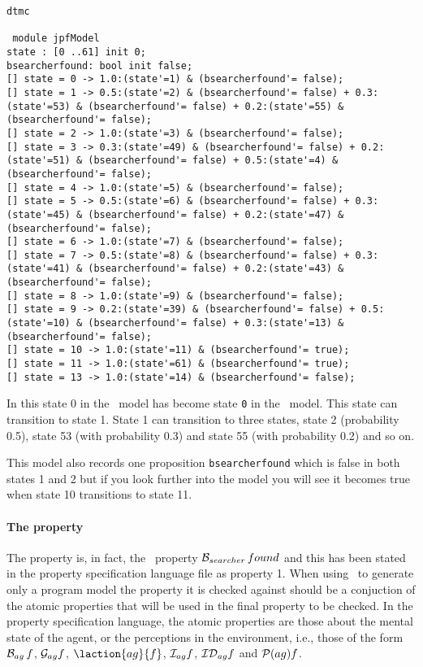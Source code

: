 \documentclass[a4]{article}
\begin{document}
\begin{verbatim}
dtmc

 module jpfModel
state : [0 ..61] init 0;
bsearcherfound: bool init false;
[] state = 0 -> 1.0:(state'=1) & (bsearcherfound'= false);
[] state = 1 -> 0.5:(state'=2) & (bsearcherfound'= false) + 0.3:(state'=53) & (bsearcherfound'= false) + 0.2:(state'=55) & (bsearcherfound'= false);
[] state = 2 -> 1.0:(state'=3) & (bsearcherfound'= false);
[] state = 3 -> 0.3:(state'=49) & (bsearcherfound'= false) + 0.2:(state'=51) & (bsearcherfound'= false) + 0.5:(state'=4) & (bsearcherfound'= false);
[] state = 4 -> 1.0:(state'=5) & (bsearcherfound'= false);
[] state = 5 -> 0.5:(state'=6) & (bsearcherfound'= false) + 0.3:(state'=45) & (bsearcherfound'= false) + 0.2:(state'=47) & (bsearcherfound'= false);
[] state = 6 -> 1.0:(state'=7) & (bsearcherfound'= false);
[] state = 7 -> 0.5:(state'=8) & (bsearcherfound'= false) + 0.3:(state'=41) & (bsearcherfound'= false) + 0.2:(state'=43) & (bsearcherfound'= false);
[] state = 8 -> 1.0:(state'=9) & (bsearcherfound'= false);
[] state = 9 -> 0.2:(state'=39) & (bsearcherfound'= false) + 0.5:(state'=10) & (bsearcherfound'= false) + 0.3:(state'=13) & (bsearcherfound'= false);
[] state = 10 -> 1.0:(state'=11) & (bsearcherfound'= true);
[] state = 11 -> 1.0:(state'=61) & (bsearcherfound'= true);
[] state = 13 -> 1.0:(state'=14) & (bsearcherfound'= false);
\end{verbatim}

In this state 0 in the \ajpf\ model has become state \texttt{0} in the \prism\ model.  This state can transition to state 1.  State 1 can transition to three states, state 2 (probability 0.5), state 53 (with probability 0.3) and state 55 (with probability 0.2) and so on.

This model also records one proposition \texttt{bsearcherfound} which is false in both states 1 and 2 but if you look further into the model you will see it becomes true when state 10 transitions to state 11.

\paragraph{The property} The property is, in fact, the \ajpf\ property $\mathrm{{\cal B}}_{searcher} \, found$ and this has been stated in the property specification language file as property 1.  When using \ajpf\ to generate only a program model the property it is checked against should be a conjuction of the atomic properties that will be used in the final property to be checked.  In the property specification language, the atomic properties are those about the mental state of the agent, or the perceptions in the environment, i.e., those of the form $\mathrm{{\cal B}}_{ag} \, f$, $\mathrm{{\cal G}}_{ag} f$, $\laction{ag}{f}$, $\mathrm{{\cal I}}_{ag} f$, $\mathrm{{\cal ID}}_{ag} f$ and $\mathrm{{\cal P}}(ag){f}$.
\end{document}
